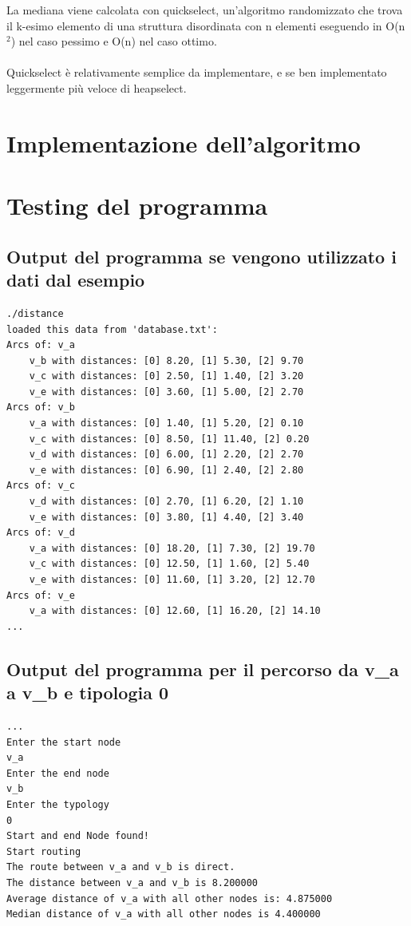 \documentclass[11pt, a4paper, titlepage, block]{article}
\begin{document}
	La mediana viene calcolata con quickselect, un'algoritmo randomizzato che trova il k-esimo elemento di una struttura disordinata con n elementi eseguendo in O(n$^2$) nel caso pessimo e O(n) nel caso ottimo.\\\\ 

	Quickselect \`{e} relativamente semplice da implementare, e se ben implementato leggermente pi\`{u} veloce di heapselect.\\
	\newpage
\section{Implementazione dell'algoritmo}
	\newpage
\section{Testing del programma}
	\subsection{Output del programma se vengono utilizzato i dati dal esempio}
	\begin{lstlisting}
./distance
loaded this data from 'database.txt':
Arcs of: v_a
	v_b with distances: [0] 8.20, [1] 5.30, [2] 9.70
	v_c with distances: [0] 2.50, [1] 1.40, [2] 3.20
	v_e with distances: [0] 3.60, [1] 5.00, [2] 2.70
Arcs of: v_b
	v_a with distances: [0] 1.40, [1] 5.20, [2] 0.10
	v_c with distances: [0] 8.50, [1] 11.40, [2] 0.20
	v_d with distances: [0] 6.00, [1] 2.20, [2] 2.70
	v_e with distances: [0] 6.90, [1] 2.40, [2] 2.80
Arcs of: v_c
	v_d with distances: [0] 2.70, [1] 6.20, [2] 1.10
	v_e with distances: [0] 3.80, [1] 4.40, [2] 3.40
Arcs of: v_d
	v_a with distances: [0] 18.20, [1] 7.30, [2] 19.70
	v_c with distances: [0] 12.50, [1] 1.60, [2] 5.40
	v_e with distances: [0] 11.60, [1] 3.20, [2] 12.70
Arcs of: v_e
	v_a with distances: [0] 12.60, [1] 16.20, [2] 14.10
...
	\end{lstlisting}
	\subsection{Output del programma per il percorso da v\_a a v\_b e tipologia 0}
	\begin{lstlisting}
...
Enter the start node
v_a
Enter the end node
v_b
Enter the typology
0
Start and end Node found!
Start routing
The route between v_a and v_b is direct.
The distance between v_a and v_b is 8.200000
Average distance of v_a with all other nodes is: 4.875000
Median distance of v_a with all other nodes is 4.400000
	\end{lstlisting}
\end{document}

